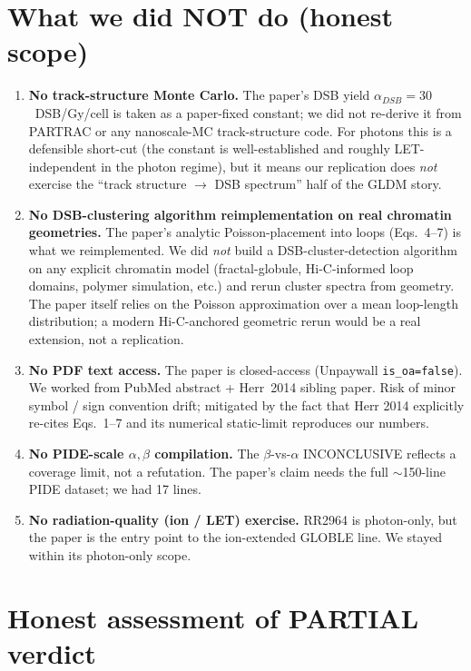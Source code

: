 \documentclass[11pt]{article}
\begin{document}
\section{What we did NOT do (honest scope)}

\begin{enumerate}
\item \textbf{No track-structure Monte Carlo.} The paper's DSB yield
$\alpha_{DSB} = 30$~DSB/Gy/cell is taken as a paper-fixed constant; we did
not re-derive it from PARTRAC or any nanoscale-MC track-structure code.
For photons this is a defensible short-cut (the constant is well-established
and roughly LET-independent in the photon regime), but it means our
replication does \emph{not} exercise the ``track structure $\rightarrow$
DSB spectrum'' half of the GLDM story.
\item \textbf{No DSB-clustering algorithm reimplementation on real chromatin
geometries.} The paper's analytic Poisson-placement into loops
(Eqs.~4--7) is what we reimplemented. We did \emph{not} build a
DSB-cluster-detection algorithm on any explicit chromatin model
(fractal-globule, Hi-C-informed loop domains, polymer simulation, etc.)
and rerun cluster spectra from geometry. The paper itself relies on the
Poisson approximation over a mean loop-length distribution; a modern
Hi-C-anchored geometric rerun would be a real extension, not a
replication.
\item \textbf{No PDF text access.} The paper is closed-access
(Unpaywall \verb|is_oa=false|). We worked from PubMed abstract + Herr~2014
sibling paper. Risk of minor symbol / sign convention drift; mitigated by
the fact that Herr 2014 explicitly re-cites Eqs.~1--7 and its numerical
static-limit reproduces our numbers.
\item \textbf{No PIDE-scale $\alpha,\beta$ compilation.} The
$\beta$-vs-$\alpha$ INCONCLUSIVE reflects a coverage limit, not a refutation.
The paper's claim needs the full $\sim$150-line PIDE dataset;
we had 17 lines.
\item \textbf{No radiation-quality (ion / LET) exercise.} RR2964 is
photon-only, but the paper is the entry point to the ion-extended GLOBLE
line. We stayed within its photon-only scope.
\end{enumerate}

\section{Honest assessment of PARTIAL verdict}
\end{document}
